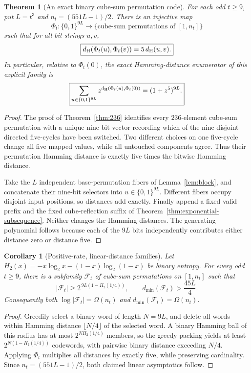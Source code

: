 \documentclass[10pt]{article}
\newtheorem{theorem}{Theorem}
\newtheorem{corollary}{Corollary}
\begin{document}
\begin{theorem}[An exact binary cube-sum permutation code]
\label{thm:code}
For each odd $t\ge9$, put $L=t^3$ and
$n_t=(551L-1)/2$.
There is an injective map
\[
\Phi_t:\{0,1\}^{9L}\longrightarrow
\{\text{cube-sum permutations of }[1,n_t]\}
\]
such that for all bit strings $u,v$,
\begin{equation}\label{eq:isometric}
\boxed{d_{\rm H}(\Phi_t(u),\Phi_t(v))
       =5\,d_{\rm H}(u,v).}
\end{equation}
In particular, relative to $\Phi_t(0)$, the
exact Hamming-distance enumerator of this
explicit family is
\[
\boxed{\sum_{u\in\{0,1\}^{9L}}
 z^{d_{\rm H}(\Phi_t(u),\Phi_t(0))}
 =(1+z^5)^{9L}.}
\]
\end{theorem}
\begin{proof}
The proof of Theorem~\ref{thm:236}
identifies every $236$-element cube-sum
permutation with a unique nine-bit vector
recording which of the nine disjoint directed
five-cycles have been switched.
Two different choices on one five-cycle
change all five mapped values, while
all untouched components agree.
Thus their permutation Hamming distance
is exactly five times the bitwise Hamming
distance.

Take the $L$ independent base-permutation
fibers of Lemma~\ref{lem:block}, and concatenate
their nine-bit selectors into $u\in\{0,1\}^{9L}$.
Different fibers occupy disjoint input positions,
so distances add exactly.
Finally append a fixed valid prefix and the
fixed cube-reflection suffix of
Theorem~\ref{thm:exponential-subsequence}.
Neither changes the Hamming distances.
The generating polynomial follows because
each of the $9L$ bits independently contributes
either distance zero or distance five.
\end{proof}

\begin{corollary}[Positive-rate, linear-distance families]
\label{cor:goodcode}
Let $H_2(x)=-x\log_2x-(1-x)\log_2(1-x)$
be binary entropy. For every odd $t\ge9$,
there is a subfamily $\mathcal F_t$ of cube-sum
permutations on $[1,n_t]$ such that
\[
|\mathcal F_t|
\ge 2^{\,9L(1-H_2(1/4))},
\qquad
d_{\min}(\mathcal F_t)>
\frac{45L}{4}.
\]
Consequently both
$\log|\mathcal F_t|=\Omega(n_t)$ and
$d_{\min}(\mathcal F_t)=\Omega(n_t)$.
\end{corollary}
\begin{proof}
Greedily select a binary word of length
$N=9L$, and delete all words within
Hamming distance $\lfloor N/4\rfloor$
of the selected word.
A binary Hamming ball of this radius has
at most $2^{NH_2(1/4)}$ members, so the
greedy packing yields at least
$2^{N(1-H_2(1/4))}$ codewords, with
pairwise binary distance exceeding $N/4$.
Applying $\Phi_t$ multiplies all distances
by exactly five, while preserving cardinality.
Since $n_t=(551L-1)/2$, both claimed
linear asymptotics follow.
\end{proof}
\end{document}
